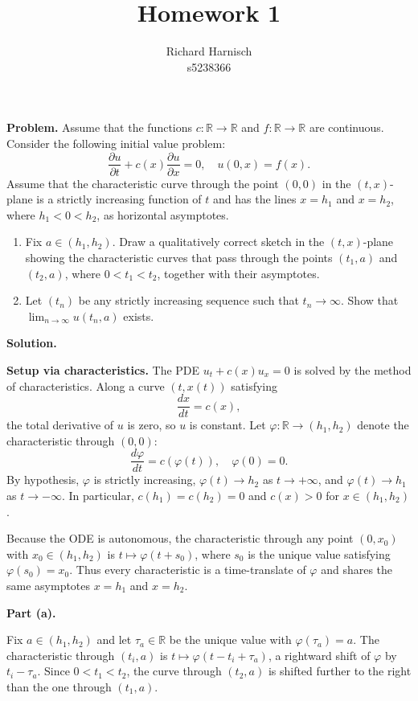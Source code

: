 \documentclass{amsart}
\title{Homework 1}
\author{Richard Harnisch \\ s5238366}
\begin{document}
\maketitle

\textbf{Problem.} Assume that the functions $c : \mathbb{R} \to \mathbb{R}$ and $f : \mathbb{R} \to \mathbb{R}$ are continuous. Consider the following initial value problem:
\[
  \frac{\partial u}{\partial t} + c(x)\frac{\partial u}{\partial x} = 0, \quad u(0, x) = f(x).
\]
Assume that the characteristic curve through the point $(0, 0)$ in the $(t, x)$-plane is a strictly increasing function of $t$ and has the lines $x = h_1$ and $x = h_2$, where $h_1 < 0 < h_2$, as horizontal asymptotes.

\begin{enumerate}
  \item[(a)] Fix $a \in (h_1, h_2)$. Draw a qualitatively correct sketch in the $(t, x)$-plane showing the characteristic curves that pass through the points $(t_1, a)$ and $(t_2, a)$, where $0 < t_1 < t_2$, together with their asymptotes.

  \item[(b)] Let $(t_n)$ be any strictly increasing sequence such that $t_n \to \infty$. Show that $\lim_{n \to \infty} u(t_n, a)$ exists.
\end{enumerate}

\bigskip
\textbf{Solution.}

\textbf{Setup via characteristics.}
The PDE $u_t + c(x)u_x = 0$ is solved by the method of characteristics. Along a curve $(t, x(t))$ satisfying
\[
  \frac{dx}{dt} = c(x),
\]
the total derivative of $u$ is zero, so $u$ is constant. Let $\varphi : \mathbb{R} \to (h_1, h_2)$ denote the characteristic through $(0,0)$:
\[
  \frac{d\varphi}{dt} = c(\varphi(t)), \quad \varphi(0) = 0.
\]
By hypothesis, $\varphi$ is strictly increasing, $\varphi(t) \to h_2$ as $t \to +\infty$, and $\varphi(t) \to h_1$ as $t \to -\infty$. In particular, $c(h_1) = c(h_2) = 0$ and $c(x) > 0$ for $x \in (h_1, h_2)$.

Because the ODE is autonomous, the characteristic through any point $(0, x_0)$ with $x_0 \in (h_1, h_2)$ is $t \mapsto \varphi(t + s_0)$, where $s_0$ is the unique value satisfying $\varphi(s_0) = x_0$. Thus every characteristic is a time-translate of $\varphi$ and shares the same asymptotes $x = h_1$ and $x = h_2$.

\medskip
\textbf{Part (a).}

Fix $a \in (h_1, h_2)$ and let $\tau_a \in \mathbb{R}$ be the unique value with $\varphi(\tau_a) = a$. The characteristic through $(t_i, a)$ is $t \mapsto \varphi(t - t_i + \tau_a)$, a rightward shift of $\varphi$ by $t_i - \tau_a$. Since $0 < t_1 < t_2$, the curve through $(t_2, a)$ is shifted further to the right than the one through $(t_1, a)$.
\end{document}
